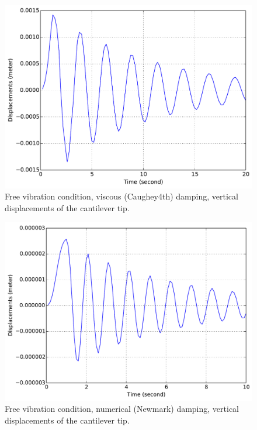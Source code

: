 \documentclass[fleqn,11pt]{article}
\begin{document}
\begin{figure}[!htb]
  \centering
  \includegraphics[width=12cm]{../Figure-files/_Chapter_Appendix_Illustrative_Examples/beam-5element-Caughey4th-damping.pdf}
  \caption{Free vibration condition, viscous (Caughey4th) damping, vertical displacements of the cantilever tip.}
  \label{fig_1beam_Caughey4th}
\end{figure}

\begin{figure}[!htb]
  \centering
  \includegraphics[width=12cm]{../Figure-files/_Chapter_Appendix_Illustrative_Examples/beam-1element-Newmark-damping.pdf}
  \caption{Free vibration condition, numerical (Newmark) damping, vertical displacements of the cantilever tip.}
  \label{fig_1beam_newmark}
\end{figure}
\end{document}
